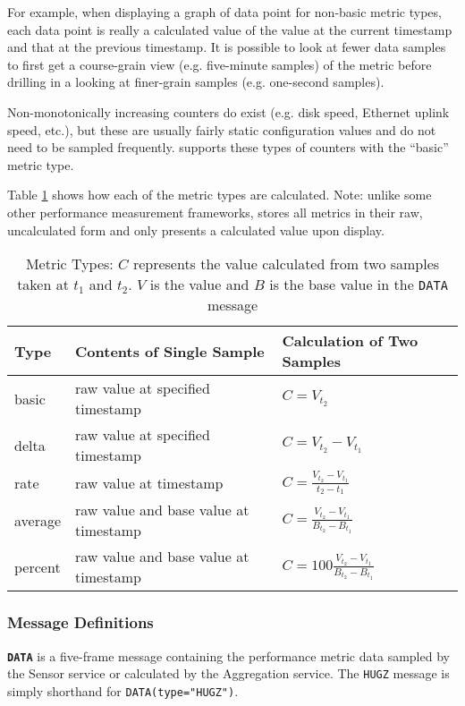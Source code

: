 For example, when displaying a graph of data point for non-basic metric types, each data point is really a calculated
value of the value at the current timestamp and that at the previous timestamp. It is possible to look at fewer data
samples to first get a course-grain view (e.g. five-minute samples) of the metric before drilling in a looking at
finer-grain samples (e.g. one-second samples).

Non-monotonically increasing counters do exist (e.g. disk speed, Ethernet uplink speed, etc.), but these are usually
fairly static configuration values and do not need to be sampled frequently. \dcamp supports these types of counters
with the ``basic'' metric type.

Table \ref{tab:metric_types} shows how each of the \dcamp metric types are calculated. Note: unlike some other
performance measurement frameworks\cite{ganglia}, \dcamp stores all metrics in their raw, uncalculated form and only
presents a calculated value upon display.

\renewcommand{\arraystretch}{1.5}
\begin{table}
\begin{tabular}{ l|l|l }
\hline
\textbf{Type} & \textbf{Contents of Single Sample} & \textbf{Calculation of Two Samples}
\tabularnewline
\hline
basic & raw value at specified timestamp & \( C = V_{t_2} \)
\tabularnewline
delta & raw value at specified timestamp & \( C = V_{t_2} - V_{t_1} \)
\tabularnewline
rate & raw value at timestamp & \( C = \frac{V_{t_2} - V_{t_1}}{t_2 - t_1} \)
\tabularnewline
average & raw value and base value at timestamp & \( C = \frac{V_{t_2} - V_{t_1}}{B_{t_2} - B_{t_1}} \)
\tabularnewline
percent & raw value and base value at timestamp & \( C = 100 \frac{V_{t_2} - V_{t_1}}{B_{t_2} - B_{t_1}} \)
\tabularnewline
\end{tabular}
\caption[Metric Types]
        {Metric Types: \(C\) represents the value calculated from two samples taken at \(t_1\) and \(t_2\). \(V\) is the
	 value and \(B\) is the base value in the \texttt{DATA} message}
\label{tab:metric_types}
\end{table}

\subsubsection{Message Definitions}

\textbf{\texttt{DATA}} is a five-frame message containing the performance metric data sampled by the Sensor service or
calculated by the Aggregation service. The \texttt{HUGZ} message is simply shorthand for \texttt{DATA(type="HUGZ")}.

